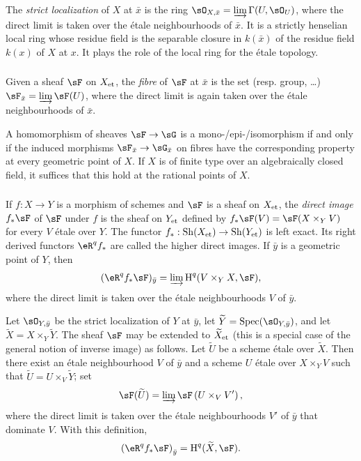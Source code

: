 The \emph{strict localization} of $X$ at $\bar x$ is the ring
$\sO_{X,\bar x}=\varinjlim\Gamma(U,\sO_U)$, where the direct limit is
taken over the étale neighbourhoods of $\bar x$. It is a strictly henselian
local ring whose residue field is the separable closure in $k(\bar x)$
of the residue field $k(x)$ of $X$ at $x$. It plays the role of the local
ring for the étale topology.

\subsubsection{}\label{I:2-3-2}

Given a sheaf $\sF$ on ${X}_{\textnormal{et}}$, the \emph{fibre} of $\sF$ at $\bar x$
is the set (resp. group, \dots)
$\sF_{\bar x}=\varinjlim\sF(U)$, where the direct limit is again taken
over the étale neighbourhoods of $\bar x$.

A homomorphism of sheaves $\sF\to\sG$ is a mono-/epi-/isomorphism if and
only if the induced morphisms $\sF_{\bar x}\to\sG_{\bar x}$ on fibres
have the corresponding property at every geometric point of $X$. If $X$
is of finite type over an algebraically closed field, it suffices that
this hold at the rational points of $X$.

\subsubsection{}\label{I:2-3-3}

If $f:X\to Y$ is a morphism of schemes and $\sF$ is a sheaf on
${X}_{\textnormal{et}}$, the \emph{direct image} $f_*\sF$ of $\sF$ under $f$ is the
sheaf on ${Y}_{\textnormal{et}}$ defined by
$f_*\sF(V)=\sF(X\times_YV)$ for every $V$ étale over $Y$. The functor
$f_*:\operatorname{Sh}({X}_{\textnormal{et}})\to\operatorname{Sh}({Y}_{\textnormal{et}})$ is left exact. Its right derived functors
$\eR^qf_*$ are called the higher direct images. If $\bar y$ is a
geometric point of $Y$, then
\[
  (\eR^q f_* \sF)_{\bar y} = \varinjlim \h^q(V\times_Y X,\sF)\text{,}
\]
where the direct limit is taken over the étale neighbourhoods $V$ of
$\bar y$.

Let $\sO_{Y,\bar y}$ be the strict localization of $Y$ at $\bar y$,
let $\widetilde Y=\spec(\sO_{Y,\bar y})$, and let
$\widetilde X=X\times_Y\widetilde Y$. The sheaf $\sF$ may be extended
to ${\widetilde X}_{\textnormal{et}}$ (this is a special case of the general notion of
inverse image) as follows. Let $\widetilde U$ be a scheme étale over
$\widetilde X$. Then there exist an étale neighbourhood $V$ of $\bar y$
and a scheme $U$ étale over $X\times_YV$ such that
$\widetilde U=U\times_V\widetilde Y$; set
\[
  \sF(\widetilde U)=\varinjlim \sF\left(U\times_V V'\right)\text{,}
\]
where the direct limit is taken over the étale neighbourhoods $V'$ of
$\bar y$ that dominate $V$. With this definition,
\[
  \left(\eR^q f_* \sF\right)_{\bar y} = \h^q(\widetilde X,\sF)\text{.}
\]

